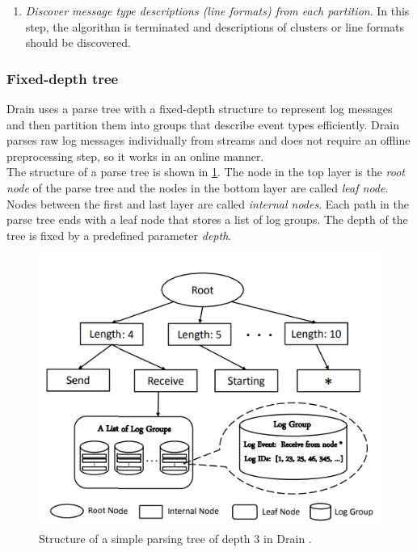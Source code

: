 \begin{enumerate}
    \item \textit{Discover message type descriptions (line formats) from each partition}. In this step, the algorithm is terminated and descriptions of clusters or line formats should be discovered.
\end{enumerate}

    \subsubsection*{Fixed-depth tree}\label{fixed_depth_tree}
    Drain \cite{drain2017} uses a parse tree with a fixed-depth structure to represent log messages and then partition them into groups that describe event types efficiently. Drain parses raw log messages individually from streams and does not require an offline preprocessing step, so it works in an online manner.\\ The structure of a parse tree is shown in \ref{parseTreeDrain}. The node in the top layer is the \textit{root node} of the parse tree and the nodes in the bottom layer are called \textit{leaf node}. Nodes between the first and last layer are called \textit{internal nodes}. Each path in the parse tree ends with a leaf node that stores a list of log groups. The depth of the tree is fixed by a predefined parameter \textit{depth}. 
    
        \begin{figure}[htbp]
            \centerline{\includegraphics[scale=.5]{img/parse-tree-drain.PNG}}
            \caption{Structure of a simple parsing tree of depth $3$ in Drain \cite{drain2017}.}
            \label{parseTreeDrain}
        \end{figure}
        
